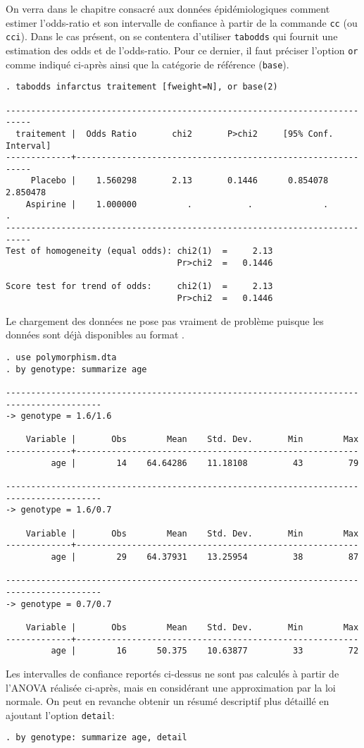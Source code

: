 On verra dans le chapitre consacré aux données épidémiologiques comment
estimer l'odds-ratio et son intervalle de confiance à partir de la commande
\texttt{cc} (ou \texttt{cci}). Dans le cas présent, on se contentera
d'utiliser \texttt{tabodds} qui fournit une estimation des odds et de
l'odds-ratio. Pour ce dernier, il faut préciser l'option \texttt{or} comme
indiqué ci-après ainsi que la catégorie de référence (\texttt{base}).
\begin{verbatim}
. tabodds infarctus traitement [fweight=N], or base(2)

---------------------------------------------------------------------------
  traitement |  Odds Ratio       chi2       P>chi2     [95% Conf. Interval]
-------------+-------------------------------------------------------------
     Placebo |    1.560298       2.13       0.1446      0.854078   2.850478
    Aspirine |    1.000000          .           .              .          .
---------------------------------------------------------------------------
Test of homogeneity (equal odds): chi2(1)  =     2.13
                                  Pr>chi2  =   0.1446

Score test for trend of odds:     chi2(1)  =     2.13
                                  Pr>chi2  =   0.1446
\end{verbatim}
%
%
%
\soln{\ref{exo:9.5}} Le chargement des données ne pose pas vraiment de
problème puisque les données sont déjà disponibles au format \Stata.
\begin{verbatim}
. use polymorphism.dta
. by genotype: summarize age

-----------------------------------------------------------------------------------------
-> genotype = 1.6/1.6

    Variable |       Obs        Mean    Std. Dev.       Min        Max
-------------+--------------------------------------------------------
         age |        14    64.64286    11.18108         43         79

-----------------------------------------------------------------------------------------
-> genotype = 1.6/0.7

    Variable |       Obs        Mean    Std. Dev.       Min        Max
-------------+--------------------------------------------------------
         age |        29    64.37931    13.25954         38         87

-----------------------------------------------------------------------------------------
-> genotype = 0.7/0.7

    Variable |       Obs        Mean    Std. Dev.       Min        Max
-------------+--------------------------------------------------------
         age |        16      50.375    10.63877         33         72
\end{verbatim}
Les intervalles de confiance reportés ci-dessus ne sont pas calculés à
partir de l'ANOVA réalisée ci-après, mais en considérant une approximation par
la loi normale. On peut en revanche obtenir un résumé descriptif plus
détaillé en ajoutant l'option \texttt{detail}: 
\begin{verbatim}
. by genotype: summarize age, detail
\end{verbatim}

